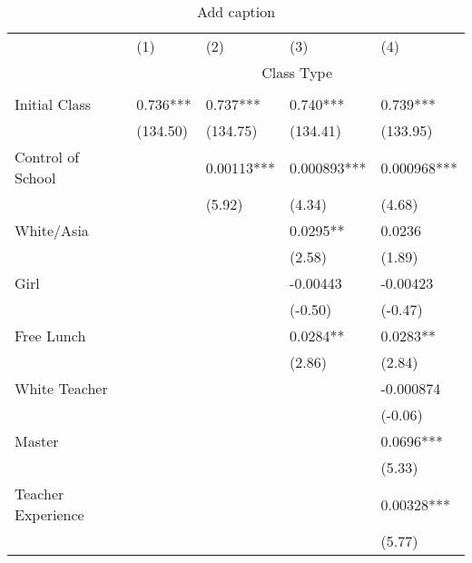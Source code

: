 \documentclass{article}
\begin{document}
{{{{{{{{{{{{{{{{%
\begin{table}[htbp]
  \centering
  \caption{Add caption}
  \label{tab:sub10}
    \begin{tabular}{lllrr}
    \toprule
          & (1)   & (2)   & \multicolumn{1}{l}{(3)} & \multicolumn{1}{l}{(4)} \\
          & \multicolumn{4}{c}{Class Type} \\
          &       &       &       &  \\
    Initial Class & 0.736*** & 0.737*** & \multicolumn{1}{l}{0.740***} & \multicolumn{1}{l}{0.739***} \\
          & (134.50) & (134.75) & \multicolumn{1}{l}{(134.41)} & \multicolumn{1}{l}{(133.95)} \\
    Control of School &       & 0.00113*** & \multicolumn{1}{l}{0.000893***} & \multicolumn{1}{l}{0.000968***} \\
          &       & (5.92) & \multicolumn{1}{l}{(4.34)} & \multicolumn{1}{l}{(4.68)} \\
    White/Asia &       &       & \multicolumn{1}{l}{0.0295**} & \multicolumn{1}{l}{0.0236} \\
          &       &       & \multicolumn{1}{l}{(2.58)} & \multicolumn{1}{l}{(1.89)} \\
    Girl  &       &       & \multicolumn{1}{l}{-0.00443} & \multicolumn{1}{l}{-0.00423} \\
          &       &       & \multicolumn{1}{l}{(-0.50)} & \multicolumn{1}{l}{(-0.47)} \\
    Free Lunch &       &       & \multicolumn{1}{l}{0.0284**} & \multicolumn{1}{l}{0.0283**} \\
          &       &       & \multicolumn{1}{l}{(2.86)} & \multicolumn{1}{l}{(2.84)} \\
    White Teacher &       &       & \multicolumn{1}{l}{} & \multicolumn{1}{l}{-0.000874} \\
          &       &       & \multicolumn{1}{l}{} & \multicolumn{1}{l}{(-0.06)} \\
    Master &       &       & \multicolumn{1}{l}{} & \multicolumn{1}{l}{0.0696***} \\
          &       &       & \multicolumn{1}{l}{} & \multicolumn{1}{l}{(5.33)} \\
    Teacher Experience &       &       & \multicolumn{1}{l}{} & \multicolumn{1}{l}{0.00328***} \\
          &       &       & \multicolumn{1}{l}{} & \multicolumn{1}{l}{(5.77)} \\

\end{tabular}
\end{table}}}}}}}}}}}}}}}}}
\end{document}

